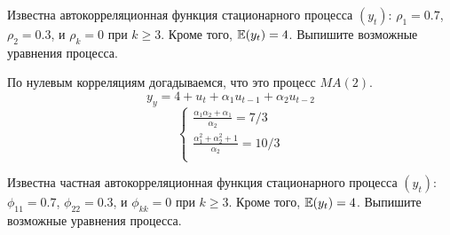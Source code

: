 \begin{problem}
  Известна автокорреляционная функция стационарного процесса $(y_t)$: $\rho_1 = 0.7$, $\rho_2 = 0.3$, и $\rho_k = 0$ при $k\geq 3$. Кроме того, $\operatorname{\mathbb{E}}(y_t)=4$. Выпишите возможные уравнения процесса.
\begin{sol}
По нулевым корреляциям догадываемся, что это процесс $MA(2)$.
\[
y_y = 4 + u_t + \alpha_1 u_{t-1} + \alpha_2 u_{t-2}
\]
\[
\begin{cases}
  \frac{\alpha_1 \alpha_2 + \alpha_1}{\alpha_2} = 7/3 \\
  \frac{\alpha_1^2 + \alpha_2^2 + 1}{\alpha_2} = 10/3 \\
\end{cases}
\]


\end{sol}
\end{problem}

\begin{problem}
  Известна частная автокорреляционная функция стационарного процесса $(y_t)$: $\phi_{11} = 0.7$, $\phi_{22} = 0.3$, и $\phi_{kk} = 0$ при $k\geq 3$. Кроме того, $\operatorname{\mathbb{E}}(y_t)=4$. Выпишите возможные уравнения процесса.
\begin{sol}
\end{sol}
\end{problem}

